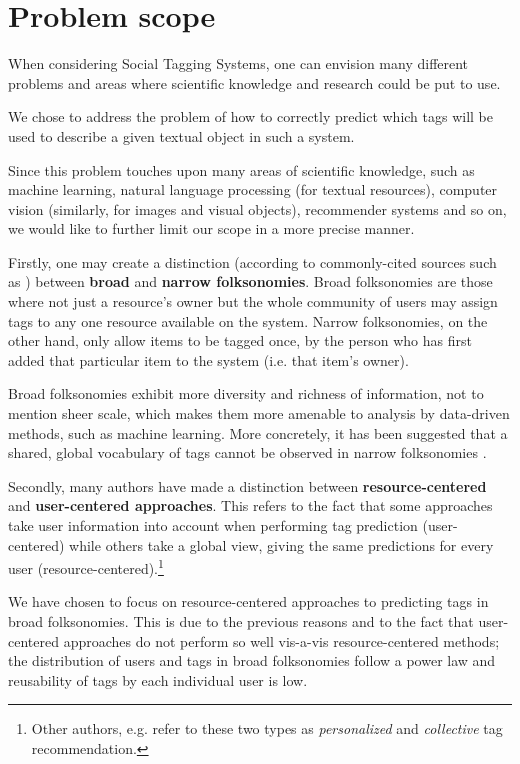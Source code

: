 \section{Problem scope}\label{section:intro_problem}

When considering Social Tagging Systems, one can envision many different problems and areas where scientific knowledge and research could be put to use.

We chose to address the problem of how to correctly predict which tags will be used to describe a given textual object in such a system. 

Since this problem touches upon many areas of scientific knowledge, such as machine learning, natural language processing (for textual resources), computer vision (similarly, for images and visual objects), recommender systems and so on, we would like to further limit our scope in a more precise manner.

Firstly, one may create a distinction (according to commonly-cited sources such as \cite{wal_2005_broad_and_narrow}) between \textbf{broad} and \textbf{narrow folksonomies}. Broad folksonomies are those where not just a resource's owner but the whole community of users may assign tags to any one resource available on the system. Narrow folksonomies, on the other hand, only allow items to be tagged once, by the person who has first added that particular item to the system (i.e. that item's owner).

Broad folksonomies exhibit more diversity and richness of information, not to mention sheer scale, which makes them more amenable to analysis by data-driven methods, such as machine learning. More concretely, it has been suggested that a shared, global vocabulary of tags cannot be observed in narrow folksonomies \citep{schifanella_etal_2010}.

Secondly, many authors \citep{illig_etal_2011,song_etal_2011} have made a distinction between \textbf{resource-centered} and \textbf{user-centered approaches}. This refers to the fact that some approaches take user information into account when performing tag prediction (user-centered) while others take a global view, giving the same predictions for every user (resource-centered).\footnote{Other authors, e.g. \cite{zhang_etal_2014} refer to these two types as \textit{personalized} and \textit{collective} tag recommendation.}

We have chosen to focus on resource-centered approaches to predicting tags in broad folksonomies. This is due to the previous reasons and to the fact \citep{song_etal_2011} that user-centered approaches do not perform so well vis-a-vis resource-centered methods; the distribution of users and tags in broad folksonomies follow a power law and reusability of tags by each individual user is low. 

